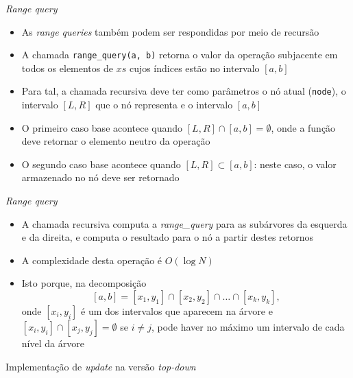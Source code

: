 \begin{frame}[fragile]{\it Range query}

    \begin{itemize}
        \item As \textit{range queries} também podem ser respondidas por meio de recursão

        \item A chamada \texttt{range\_query(a, b)} retorna o valor da operação subjacente em todos
            os elementos de $xs$ cujos índices estão no intervalo $[a, b]$

        \item Para tal, a chamada recursiva deve ter como parâmetros o nó atual (\texttt{node}),
            o intervalo $[L, R]$ que o nó representa e o intervalo $[a, b]$

        \item O primeiro caso base acontece quando $[L, R]\cap [a, b] = \emptyset$, onde a
            função deve retornar o elemento neutro da operação

        \item O segundo caso base acontece quando $[L, R]\subset [a, b]$: neste caso, o valor
            armazenado no nó deve ser retornado

    \end{itemize}

\end{frame}

\begin{frame}[fragile]{\it Range query}

    \begin{itemize}
        \item A chamada recursiva computa a \textit{range\_query} para as subárvores da esquerda
            e da direita, e computa o resultado para o nó a partir destes retornos

        \item A complexidade desta operação é $O(\log N)$

        \item Isto porque, na decomposição 
            \[
                [a, b] = [x_1, y_1]\cap [x_2, y_2]\cap \ldots \cap [x_k, y_k],
            \] 
            onde $[x_i, y_i]$ é um dos intervalos que aparecem na árvore e $[x_i, y_i]\cap
                [x_j, y_j] = \emptyset$ se $i\neq j$, pode haver no máximo um intervalo
                de cada nível da árvore
    \end{itemize}

\end{frame}



\begin{frame}[fragile]{Implementação de {\it update} na versão {\it top-down}}
\end{frame}
